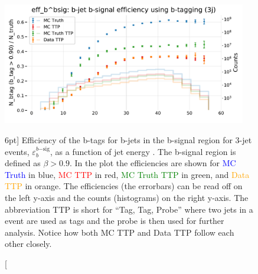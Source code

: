 \documentclass[a4paper, twoside]{tufte-book}
\newcommand{\code}[1]{\colorbox{light-gray}{\texttt{\detokenize{#1}}}}
\newcommand{\q}[1]{``#1''}
\begin{document}
\begin{figure}
  \includegraphics[width=0.95\textwidth, trim=0 0 0 40, clip]{figures/quarks/eff_b_bsig-down_sample=1.00-ML_vars=vertex-selection=b-ejet_min=4-n_iter_RS_lgb=99-n_iter_RS_xgb=9-cdot_cut=0.90-version=19.pdf}
  \caption[b-Tagging Efficiency $\varepsilon_b^{b\mathrm{-sig}}$ as a function of jet energy][6pt]
          {Efficiency of the b-tags for b-jets in the b-signal region for 3-jet events, $\varepsilon_b^{b\mathrm{-sig}}$, as a function of jet energy \code{Ejet}. The b-signal region is defined as $\beta > 0.9$. In the plot the efficiencies are shown for \textcolor{blue}{MC Truth} in blue, \textcolor{red}{MC TTP} in red, \textcolor{green}{MC Truth TTP} in green, and \textcolor{orange}{Data TTP} in orange. The efficiencies (the errorbars) can be read off on the left y-axis and the counts (histograms) on the right y-axis. The abbreviation TTP is short for \q{Tag, Tag, Probe} where two jets in a event are used as tags and the probe is then used for further analysis. Notice how both MC TTP and Data TTP follow each other closely.  
          } 
  \label{fig:q:effiency_btag_bjet_bsig}
\end{figure}
\end{document}
